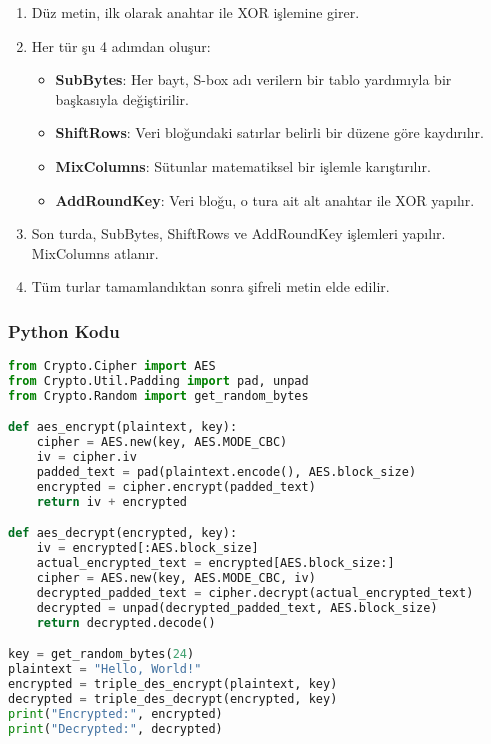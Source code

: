 \begin{enumerate}
    \item Düz metin, ilk olarak anahtar ile XOR işlemine girer.
    \item Her tür şu 4 adımdan oluşur:
    \begin{itemize}
        \item \textbf{SubBytes}: Her bayt, S-box adı verilern bir tablo yardımıyla bir başkasıyla değiştirilir.
        \item \textbf{ShiftRows}: Veri bloğundaki satırlar belirli bir düzene göre kaydırılır.
        \item \textbf{MixColumns}: Sütunlar matematiksel bir işlemle karıştırılır.
        \item \textbf{AddRoundKey}: Veri bloğu, o tura ait alt anahtar ile XOR yapılır.
    \end{itemize}
    \item Son turda, SubBytes, ShiftRows ve AddRoundKey işlemleri yapılır. MixColumns atlanır.
    \item Tüm turlar tamamlandıktan sonra şifreli metin elde edilir.
\end{enumerate}

\subsubsection{Python Kodu}

\begin{lstlisting}[language=Python]
from Crypto.Cipher import AES
from Crypto.Util.Padding import pad, unpad
from Crypto.Random import get_random_bytes

def aes_encrypt(plaintext, key):
    cipher = AES.new(key, AES.MODE_CBC)
    iv = cipher.iv
    padded_text = pad(plaintext.encode(), AES.block_size)
    encrypted = cipher.encrypt(padded_text)
    return iv + encrypted

def aes_decrypt(encrypted, key):
    iv = encrypted[:AES.block_size]
    actual_encrypted_text = encrypted[AES.block_size:]
    cipher = AES.new(key, AES.MODE_CBC, iv)
    decrypted_padded_text = cipher.decrypt(actual_encrypted_text)
    decrypted = unpad(decrypted_padded_text, AES.block_size)
    return decrypted.decode()

key = get_random_bytes(24)
plaintext = "Hello, World!"
encrypted = triple_des_encrypt(plaintext, key)
decrypted = triple_des_decrypt(encrypted, key)
print("Encrypted:", encrypted)
print("Decrypted:", decrypted)
\end{lstlisting}

\newpage